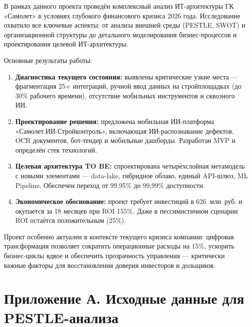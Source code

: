 \documentclass[12pt,a4paper]{article}
\begin{document}
В рамках данного проекта проведён комплексный анализ ИТ-архитектуры ГК «Самолет» в условиях глубокого финансового кризиса 2026 года. Исследование охватило все ключевые аспекты: от анализа внешней среды (PESTLE, SWOT) и организационной структуры до детального моделирования бизнес-процессов и проектирования целевой ИТ-архитектуры.

Основные результаты работы:

\begin{enumerate}[leftmargin=20pt]
  \item \textbf{Диагностика текущего состояния:} выявлены критические узкие места --- фрагментация 25+ интеграций, ручной ввод данных на стройплощадках (до 30\% рабочего времени), отсутствие мобильных инструментов и сквозного ИИ.

  \item \textbf{Проектирование решения:} предложена мобильная ИИ-платформа «Самолет.ИИ-Стройконтроль», включающая ИИ-распознавание дефектов, OCR документов, бот-тендер и мобильные дашборды. Разработан MVP и определён стек технологий.

  \item \textbf{Целевая архитектура TO BE:} спроектирована четырёхслойная метамодель с новыми элементами --- data-lake, гибридное облако, единый API-шлюз, ML Pipeline. Обеспечен переход от 99,95\% до 99,99\% доступности.

  \item \textbf{Экономическое обоснование:} проект требует инвестиций в 626~млн~руб. и окупается за 18 месяцев при ROI 155\%. Даже в пессимистичном сценарии ROI остаётся положительным (25\%).
\end{enumerate}

Проект особенно актуален в контексте текущего кризиса компании: цифровая трансформация позволяет сократить операционные расходы на 15\%, ускорить бизнес-циклы вдвое и обеспечить прозрачность управления --- критически важные факторы для восстановления доверия инвесторов и дольщиков.

\newpage

\appendix
\section{Приложение А. Исходные данные для PESTLE-анализа}
\end{document}
